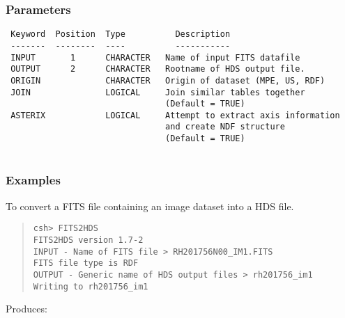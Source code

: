 \documentclass{book}
\renewcommand{\_}{{\tt\char'137}}     %
\begin{document}
\subsubsection{Parameters}
\begin{verbatim}
 Keyword  Position  Type          Description
 -------  --------  ----          -----------
 INPUT       1      CHARACTER   Name of input FITS datafile
 OUTPUT      2      CHARACTER   Rootname of HDS output file.
 ORIGIN             CHARACTER   Origin of dataset (MPE, US, RDF)
 JOIN               LOGICAL     Join similar tables together
                                (Default = TRUE)
 ASTERIX            LOGICAL     Attempt to extract axis information
                                and create NDF structure
                                (Default = TRUE)
 
\end{verbatim}\subsubsection{Examples}
To convert a FITS file containing an image dataset into a HDS file.
\begin{quote}\begin{verbatim}
csh> FITS2HDS
FITS2HDS version 1.7-2
INPUT - Name of FITS file > RH201756N00_IM1.FITS
FITS file type is RDF
OUTPUT - Generic name of HDS output files > rh201756_im1
Writing to rh201756_im1
\end{verbatim}\end{quote}
Produces:
\end{document}
